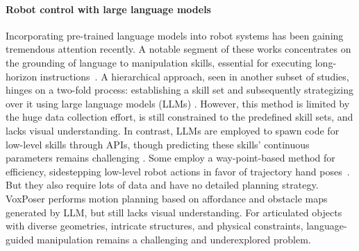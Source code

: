 \paragraph{Robot control with large language models}
%
Incorporating pre-trained language models into robot systems has been gaining tremendous attention recently. A notable segment of these works concentrates on the grounding of language to manipulation skills, essential for executing long-horizon instructions~\citep{jang2022bc,stepputtis2020language,mees2022matters,codevilla2018driving,shao2021concept2robot,akakzia2021grounding,gong2023arnold,goyal2021zero,shridhar2022cliport,hu2019hierarchical, you2023make}. A hierarchical approach, seen in another subset of studies, hinges on a two-fold process: establishing a skill set and subsequently strategizing over it using large language models (LLMs) \citep{brohan2023can,huang2022inner,singh2022progprompt,huang2022language,lin2023text2motion,jiang2022vima}. However, this method is limited by the huge data collection effort, is still constrained to the predefined skill sets, and lacks visual understanding. In contrast, LLMs are employed to spawn code for low-level skills through APIs, though predicting these skills' continuous parameters remains challenging \citep{codeaspolicies2022}.
Some employ a way-point-based method for efficiency, sidestepping low-level robot actions in favor of trajectory hand poses~\citep{shridhar2023perceiver, gong2023arnold}. But they also require lots of data and have no detailed planning strategy. VoxPoser
\citep{huang2023voxposer} performs motion planning based on affordance and obstacle maps generated by LLM, but still lacks visual understanding.
%
For articulated objects with diverse geometries, intricate structures, and physical constraints, language-guided manipulation remains a challenging and underexplored problem.



